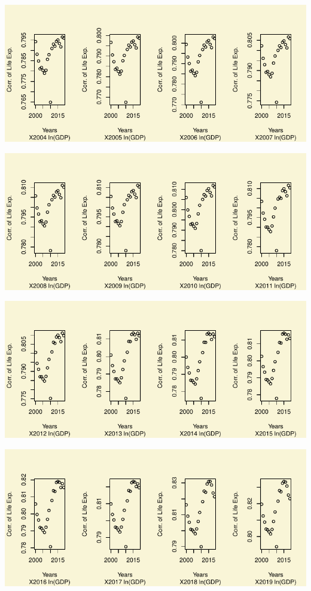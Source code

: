 \documentclass[
]{article}
\begin{document}
\includegraphics{main_files/figure-pdf/unnamed-chunk-27-2.pdf}

\includegraphics{main_files/figure-pdf/unnamed-chunk-27-3.pdf}

\includegraphics{main_files/figure-pdf/unnamed-chunk-27-4.pdf}

\includegraphics{main_files/figure-pdf/unnamed-chunk-27-5.pdf}
\end{document}
